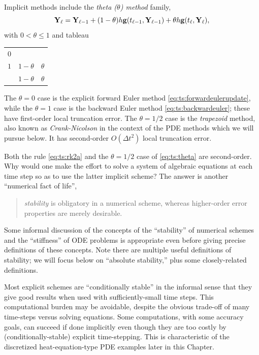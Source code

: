 Implicit methods include the \emph{theta ($\theta$) method} family,
\begin{equation}
\mathbf{Y}_\ell = \mathbf{Y}_{\ell-1} + (1-\theta) h \mathbf{g}(t_{\ell-1},\mathbf{Y}_{\ell-1}) + \theta h \mathbf{g}(t_\ell,\mathbf{Y}_{\ell}),  \label{eq:ts:theta}
\end{equation}
with $0<\theta\le 1$ and tableau
\begin{center}
\begin{tabular}{c|cc}
$0$   \\
$1$ & $1-\theta$ & $\theta$ \\ \hline
    & $1-\theta$ & $\theta$
\end{tabular}
\end{center}
The $\theta=0$ case is the explicit forward Euler method \eqref{eq:ts:forwardeulerupdate}, while the $\theta=1$ case is the backward Euler method \eqref{eq:ts:backwardeuler}; these have first-order local truncation error.  The $\theta=1/2$ case is the \emph{trapezoid} method, also known as \emph{Crank-Nicolson} \citep{MortonMayers2005} in the context of the PDE methods which we will pursue below.  It has second-order $O(\Delta t^2)$ local truncation error.

Both the \RKtwoa rule \eqref{eq:ts:rk2a} and the $\theta=1/2$ case of \eqref{eq:ts:theta} are second-order.  Why would one make the effort to solve a system of algebraic equations at each time step so as to use the latter implicit scheme?  The answer is another ``numerical fact of life'',
\begin{quote}
\emph{stability} is obligatory in a numerical scheme, whereas higher-order error properties are merely desirable.
\end{quote}

Some informal discussion of the concepts of the ``stability'' of numerical schemes and the ``stiffness'' of ODE problems is appropriate even before giving precise definitions of these concepts.  Note there are multiple useful definitions of stability; we will focus below on ``absolute stability,'' plus some closely-related definitions.

Most explicit schemes are ``conditionally stable'' in the informal sense that they give good results when used with sufficiently-small time steps.  This computational burden may be avoidable, despite the obvious trade-off of many time-steps versus solving equations.  Some computations, with some accuracy goals, can succeed if done implicitly even though they are too costly by (conditionally-stable) explicit time-stepping.  This is characteristic of the discretized heat-equation-type PDE examples later in this Chapter.

